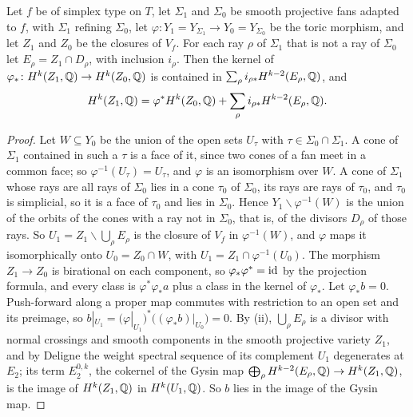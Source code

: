 \begin{lemma}\label{lem:toricmod}
Let $f$ be of simplex type on $T$, let $\Sigma_{1}$ and $\Sigma_{0}$ be
smooth projective fans adapted to $f$, with $\Sigma_{1}$ refining
$\Sigma_{0}$, let $\varphi\colon Y_{1}=Y_{\Sigma_{1}}\to Y_{0}=Y_{\Sigma_{0}}$
be the toric morphism, and let $Z_{1}$ and $Z_{0}$ be the closures of
$V_{f}$. For each ray $\rho$ of $\Sigma_{1}$ that is not a ray of
$\Sigma_{0}$ let $E_{\rho}=Z_{1}\cap D_{\rho}$, with inclusion $i_{\rho}$.
Then the kernel of $\varphi_{*}\colon H^{k}(Z_{1},\mathbb{Q})\to H^{k}(Z_{0},\mathbb{Q})$ is
contained in $\sum_{\rho}i_{\rho*}H^{k-2}(E_{\rho},\mathbb{Q})$, and
\[
  H^{k}(Z_{1},\mathbb{Q})=\varphi^{*}H^{k}(Z_{0},\mathbb{Q})
  +\sum_{\rho}i_{\rho*}H^{k-2}(E_{\rho},\mathbb{Q}).
\]
\end{lemma}

\begin{proof}
Let $W\subseteq Y_{0}$ be the union of the open sets $U_{\tau}$ with
$\tau\in\Sigma_{0}\cap\Sigma_{1}$. A cone of $\Sigma_{1}$ contained in such a
$\tau$ is a face of it, since two cones of a fan meet in a common face; so
$\varphi^{-1}(U_{\tau})=U_{\tau}$, and $\varphi$ is an isomorphism over $W$. A
cone of $\Sigma_{1}$ whose rays are all rays of $\Sigma_{0}$ lies in a cone
$\tau_{0}$ of $\Sigma_{0}$, its rays are rays of $\tau_{0}$, and $\tau_{0}$
is simplicial, so it is a face of $\tau_{0}$ and lies in $\Sigma_{0}$. Hence
$Y_{1}\smallsetminus\varphi^{-1}(W)$ is the union of the orbits of the cones
with a ray not in $\Sigma_{0}$, that is, of the divisors $D_{\rho}$ of those
rays. So $U_{1}=Z_{1}\smallsetminus\bigcup_{\rho}E_{\rho}$ is the closure of
$V_{f}$ in $\varphi^{-1}(W)$, and $\varphi$ maps it isomorphically onto
$U_{0}=Z_{0}\cap W$, with $U_{1}=Z_{1}\cap\varphi^{-1}(U_{0})$. The morphism
$Z_{1}\to Z_{0}$ is birational on each component, so $\varphi_{*}\varphi^{*}
=\operatorname{id}$ by the projection formula, and every class is $\varphi^{*}\varphi_{*}a$
plus a class in the kernel of $\varphi_{*}$. Let $\varphi_{*}b=0$.
Push-forward along a proper map commutes with restriction to an open set and
its preimage, so $b|_{U_{1}}=(\varphi|_{U_{1}})^{*}\bigl((\varphi_{*}b)|_{U_{0}}
\bigr)=0$. By (ii), $\bigcup_{\rho}E_{\rho}$ is a
divisor with normal crossings and smooth components in the smooth projective
variety $Z_{1}$, and by Deligne \cite[\S3.2]{Del71} the weight spectral
sequence of its complement $U_{1}$ degenerates at $E_{2}$; its term
$E_{2}^{0,k}$, the cokernel of the Gysin map
$\bigoplus_{\rho}H^{k-2}(E_{\rho},\mathbb{Q})\to H^{k}(Z_{1},\mathbb{Q})$, is the image of
$H^{k}(Z_{1},\mathbb{Q})$ in $H^{k}(U_{1},\mathbb{Q})$. So $b$ lies in the image of the
Gysin map.
\end{proof}

